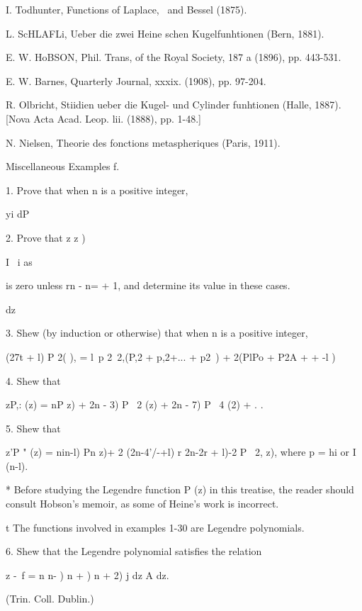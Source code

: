 {{{{I. Todhunter, Functions of Laplace, \Lame\ and Bessel (1875).

L. ScHLAFLi, Ueber die zwei Heine schen Kugelfunhtionen (Bern, 1881).

E. W. HoBSON, Phil. Trans, of the Royal Society, 187 a (1896), pp.
443-531.

E. W. Barnes, Quarterly Journal, xxxix. (1908), pp. 97-204.

R. Olbricht, Stiidien ueber die Kugel- und Cylinder funhtionen (Halle,
1887). [Nova Acta Acad. Leop. lii. (1888), pp. 1-48.]

N. Nielsen, Theorie des fonctions metaspheriques (Paris, 1911).

Miscellaneous Examples f.

1. Prove that when n is a positive integer,


yi dP

2. Prove that z z )

I \ i as

is zero unless rn - n= + 1, and determine its value in these cases.

dz


3. Shew (by induction or otherwise) that when n is a positive integer,

(27t + l) P 2( ), = l\ p 2\ 2,(P,2 + p,2+... + p2 \,) + 2(PlPo + P2A
+ + -l ) 

4. Shew that

zP,: (z) = nP z) + 2n - 3) P \ 2 (z) + 2n - 7) P \ 4 (2) + .  . 


5. Shew that

z'P " (z) = nin-l) Pn z)+ 2 (2n-4'/-+l) r 2n-2r + l)-2 P \ 2, z),
where p = hi or I (n-l). 

* Before studying the Legendre function P (z) in this treatise, the
reader should consult Hobson's memoir, as some of Heine's work is
incorrect.

t The functions involved in examples 1-30 are Legendre polynomials.

%
%

6. Shew that the Legendre polynomial satisfies the relation

 z -\ f = n n- ) n + ) n + 2) j dz A dz.

(Trin. Coll. Dublin.)

}}}}
